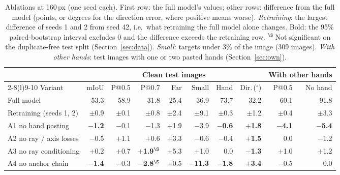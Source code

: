 \begin{table}[t]
  \caption{Ablations at 160\,px (one seed each). First row: the full model's values; other rows: difference from the full model (points, or degrees for the direction error, where positive means worse). \emph{Retraining}: the largest difference of seeds 1 and 2 from seed 42, i.e.\ what retraining the full model alone changes. Bold: the 95\% paired-bootstrap interval excludes 0 and the difference exceeds the retraining row. $^\S$\,Not significant on the duplicate-free test split (Section~\ref{sec:data}). \emph{Small}: targets under 3\% of the image (309 images). \emph{With other hands}: test images with one or two pasted hands (Section~\ref{sec:own}).}
  \label{tab:ablation}
  \footnotesize
  \setlength{\tabcolsep}{3pt}
  \begin{tabular}{lrrrrrrrrr}
    \toprule
    & \multicolumn{7}{c}{Clean test images} & \multicolumn{2}{c}{With other hands} \\
    \cmidrule(lr){2-8}\cmidrule(l){9-10}
    Variant & mIoU & P@0.5 & P@0.7 & Far & Small & Hand & Dir.\,($^\circ$) & P@0.5 & No hand \\
    \midrule
    Full model & 53.3 & 58.9 & 31.8 & 25.4 & 36.9 & 73.7 & 32.2 & 60.1 & 91.8 \\
    \quad Retraining (seeds 1, 2) & $\pm$0.9 & $\pm$0.1 & $\pm$0.8 & $\pm$2.4 & $\pm$9.1 & $\pm$0.3 & $\pm$1.2 & $\pm$0.4 & $\pm$3.3 \\
    \midrule
    A1 no hand pasting & \textbf{$-$1.2} & $-$0.1 & $-$1.3 & $+$1.9 & $-$3.9 & \textbf{$-$0.6} & \textbf{$+$1.8} & \textbf{$-$4.1} & \textbf{$-$5.4} \\
    A2 no ray / axis losses & $-$0.5 & $+$1.1 & $+$0.6 & $+$3.3 & $-$0.6 & $-$0.4 & \textbf{$+$1.5} & 0.0 & $-$1.2 \\
    A3 no ray conditioning & $+$0.2 & $+$0.7 & \textbf{$+$1.9}$^\S$ & $+$5.3 & $+$1.0 & 0.0 & \textbf{$-$1.3} & $+$1.0 & $+$1.2 \\
    A4 no anchor chain & \textbf{$-$1.4} & $-$0.3 & \textbf{$-$2.8}$^\S$ & $+$0.5 & \textbf{$-$11.3} & \textbf{$-$1.8} & \textbf{$+$3.4} & $-$0.5 & 0.0 \\
    \bottomrule
  \end{tabular}
\end{table}

